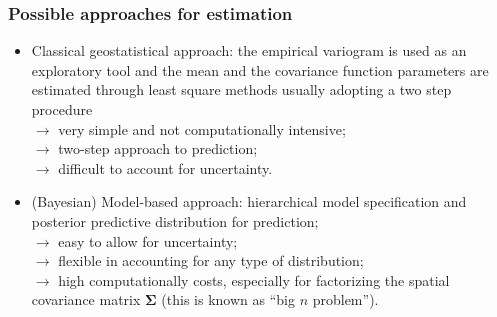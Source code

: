 \documentclass[slidestop,compress,serif,10pt]{beamer}
\begin{document}
\begin{frame}
\frametitle{Possible approaches for estimation}
\begin{itemize}

\vfill\item \alert{Classical geostatistical approach}: the empirical variogram is used as an exploratory tool and the mean and the covariance function parameters are estimated through  least square methods usually adopting a two step procedure\\ 
$\rightarrow$  very simple and not computationally intensive;\\
$\rightarrow$  two-step approach to prediction;\\
$\rightarrow$  difficult to account for uncertainty. 

\pause
\vfill\item \alert{(Bayesian) Model-based}  \alert{approach}:  hierarchical model specification and posterior predictive distribution for prediction;\\
$\rightarrow$  easy to allow for uncertainty;\\
$\rightarrow$  flexible in accounting for any type of distribution;\\
$\rightarrow$ high computationally costs, especially for factorizing the spatial covariance matrix $\bm \Sigma$ (this is known as ``big $n$ problem'').
\end{itemize}

%
\end{frame}
\end{document}
